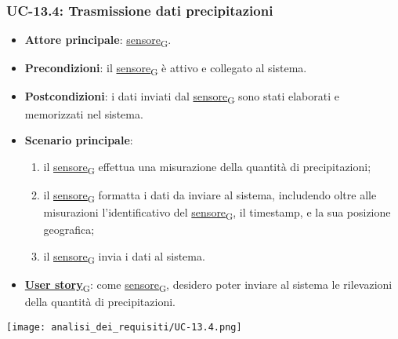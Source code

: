 \newpage

\subsubsection{UC-13.4: Trasmissione dati precipitazioni}
\begin{itemize}
	\item \textbf{Attore principale}: \href{https://7last.github.io/docs/rtb/documentazione-interna/glossario\#sensore}{sensore\textsubscript{G}}.
	\item \textbf{Precondizioni}: il \href{https://7last.github.io/docs/rtb/documentazione-interna/glossario\#sensore}{sensore\textsubscript{G}} è attivo e collegato al sistema.
	\item \textbf{Postcondizioni}: i dati inviati dal \href{https://7last.github.io/docs/rtb/documentazione-interna/glossario\#sensore}{sensore\textsubscript{G}} sono stati elaborati e memorizzati nel sistema.
	\item \textbf{Scenario principale}:
	      \begin{enumerate}
		      \item il \href{https://7last.github.io/docs/rtb/documentazione-interna/glossario\#sensore}{sensore\textsubscript{G}} effettua una misurazione della quantità di precipitazioni;
		      \item il \href{https://7last.github.io/docs/rtb/documentazione-interna/glossario\#sensore}{sensore\textsubscript{G}} formatta i dati da inviare al sistema, includendo oltre alle misurazioni l'identificativo del \href{https://7last.github.io/docs/rtb/documentazione-interna/glossario\#sensore}{sensore\textsubscript{G}},
		            il timestamp, e la sua posizione geografica;
		      \item il \href{https://7last.github.io/docs/rtb/documentazione-interna/glossario\#sensore}{sensore\textsubscript{G}} invia i dati al sistema.
	      \end{enumerate}
	\item \href{https://7last.github.io/docs/rtb/documentazione-interna/glossario\#user-story}{\textbf{User story}\textsubscript{G}}: come \href{https://7last.github.io/docs/rtb/documentazione-interna/glossario\#sensore}{sensore\textsubscript{G}}, desidero poter inviare al sistema le rilevazioni della quantità di precipitazioni.
\end{itemize}

\begin{center}
	\texttt{[image: analisi\_dei\_requisiti/UC-13.4.png]}
\end{center}
\newpage
